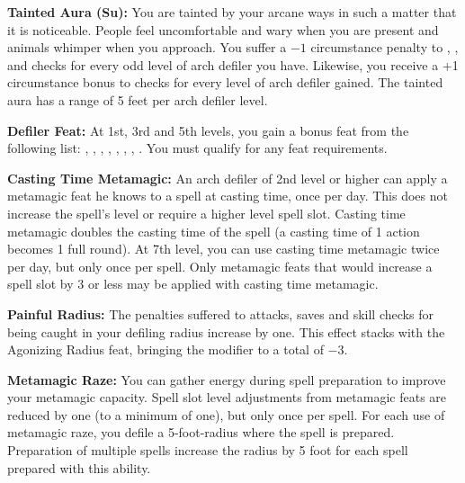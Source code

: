 \textbf{Tainted Aura (Su):} You are tainted by your arcane ways in such a matter that it is noticeable. People feel uncomfortable and wary when you are present and animals whimper when you approach. You suffer a $-1$ circumstance penalty to , ,  and  checks for every odd level of arch defiler you have. Likewise, you receive a +1 circumstance bonus to  checks for every level of arch defiler gained. The tainted aura has a range of 5 feet
per arch defiler level.

\textbf{Defiler Feat:} At 1st, 3rd and 5th levels, you gain a bonus feat from the following list: , , , , , , , . You must qualify for any feat requirements.

\textbf{Casting Time Metamagic:} An arch defiler of 2nd level or higher can apply a metamagic feat he knows to a spell at casting time, once per day. This does not increase the spell's level or require a higher level spell slot. Casting time metamagic doubles the casting time of the spell (a casting time of 1 action becomes 1 full round). At 7th level, you can use casting time metamagic twice per day, but only once per spell. Only metamagic feats that would increase a spell slot by 3 or less may be applied with casting time metamagic.

\textbf{Painful Radius:} The penalties suffered to attacks, saves and skill checks for being caught in your defiling radius increase by one. This effect stacks with the Agonizing Radius feat, bringing the modifier to a total of $-3$.

\textbf{Metamagic Raze:} You can gather energy during spell preparation to improve your metamagic capacity. Spell slot level adjustments from metamagic feats are reduced by one (to a minimum of one), but only once per spell. For each use of metamagic raze, you defile a 5-foot-radius where the spell is prepared. Preparation of multiple spells increase the radius by 5 foot for each spell prepared with this ability.


